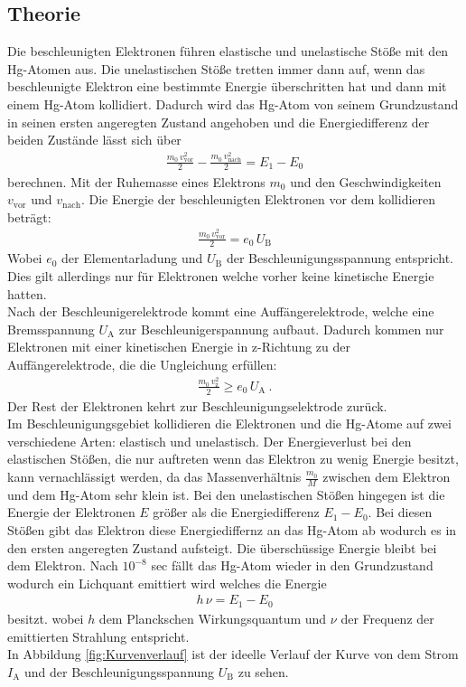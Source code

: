 \subsection{Theorie}
Die beschleunigten Elektronen führen elastische und unelastische Stöße mit den Hg-Atomen aus. Die unelastischen Stöße tretten immer dann auf, wenn das beschleunigte Elektron eine bestimmte Energie überschritten hat und dann mit einem Hg-Atom kollidiert. Dadurch wird das Hg-Atom von seinem Grundzustand in seinen ersten angeregten Zustand angehoben und die Energiedifferenz der beiden Zustände lässt sich über
\begin{align}
	\frac{m_0\, v_\text{vor}^2}{2} - \frac{m_0\, v_\text{nach}^2}{2} = E_1 - E_0
\end{align}
berechnen. Mit der Ruhemasse eines Elektrons $m_0$ und den Geschwindigkeiten $v_\text{vor}$ und $v_\text{nach}$. Die Energie der beschleunigten Elektronen vor dem kollidieren beträgt:
\begin{align}
	\frac{m_0\, v_\text{vor}^2}{2} = e_0\, U_\text{B}
\end{align}
Wobei $e_0$ der Elementarladung und $U_\text{B}$ der Beschleunigungsspannung entspricht. Dies gilt allerdings nur für Elektronen welche vorher keine kinetische Energie hatten. \\
Nach der Beschleunigerelektrode kommt eine Auffängerelektrode, welche eine Bremsspannung $U_\text{A}$ zur Beschleunigerspannung aufbaut. Dadurch kommen nur Elektronen mit einer kinetischen Energie in z-Richtung zu der Auffängerelektrode, die die Ungleichung erfüllen:
\begin{align}
	\frac{m_0\, v_\text{z}^2}{2} \ge e_0\, U_\text{A} \ .
\end{align}
Der Rest der Elektronen kehrt zur Beschleunigungselektrode zurück. \\
Im Beschleunigungsgebiet kollidieren die Elektronen und die Hg-Atome auf zwei verschiedene Arten: elastisch und unelastisch. Der Energieverlust bei den elastischen Stößen, die nur auftreten wenn das Elektron zu wenig Energie besitzt, kann vernachlässigt werden, da das Massenverhältnis $\frac{m_0}{M}$ zwischen dem Elektron und dem Hg-Atom sehr klein ist. Bei den unelastischen Stößen hingegen ist die Energie der Elektronen $E$ größer als die Energiedifferenz $E_1 - E_0$. Bei diesen Stößen gibt das Elektron diese Energiediffernz an das Hg-Atom ab wodurch es in den ersten angeregten Zustand aufsteigt. Die überschüssige Energie bleibt bei dem Elektron. Nach $10^{-8}$ sec fällt das Hg-Atom wieder in den Grundzustand wodurch ein Lichquant emittiert wird welches die Energie
\begin{align}
	h\, \nu = E_1 - E_0
\end{align}
besitzt. wobei $h$ dem Planckschen Wirkungsquantum und $\nu$ der Frequenz der emittierten Strahlung entspricht. \\
In Abbildung \eqref{fig:Kurvenverlauf} ist der ideelle Verlauf der Kurve von dem Strom $I_\text{A}$ und der Beschleunigungsspannung $U_\text{B}$ zu sehen.

